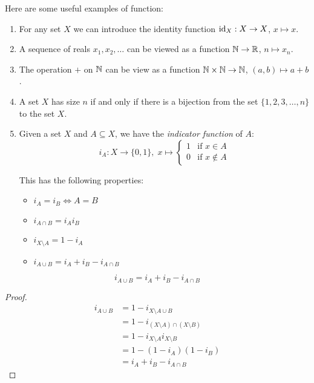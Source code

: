 \documentclass[../main.tex]{subfiles}
\begin{document}
\begin{example}
  Here are some useful examples of function:
  \begin{enumerate}
    \item For any set $X$ we can introduce the identity function $\mathrm{id}_X: X \to X$, $x \mapsto x$.
    \item A sequence of reals $x_1, x_2, \ldots$ can be viewed as a function $\mathbb{N} \to \mathbb{R}$, $n \mapsto x_n$.
    \item The operation $+$ on $\mathbb{N}$ can be view as a function $\mathbb{N} \times \mathbb{N} \to \mathbb{N}$, $(a, b) \mapsto a + b$.
    \item A set $X$ has size $n$ if and only if there is a bijection from the set $\{1, 2, 3, \ldots, n\}$ to the set $X$.
    \item Given a set $X$ and $A \subseteq X$, we have the \textit{indicator function} of $A$:
      \[
        i_A: X \to \{0, 1\},\;
        x \mapsto \begin{cases}
          1 & \text{if } x\in A \\
          0 & \text{if } x\notin A
        \end{cases}
      \]

    This has the following properties:
    \begin{itemize}
      \item $i_A = i_B \iff A = B$
      \item $i_{A \cap B} = i_A i_B$
      \item $i_{X \setminus A} = 1 - i_A$
      \item $i_{A \cup B} = i_A + i_B - i_{A \cap B}$
    \end{itemize}
  \end{enumerate}
\end{example}
\begin{proposition}
  \[
    i_{A \cup B} = i_A + i_B - i_{A \cap B}
  \]
\end{proposition}
\begin{proof}
  \begin{align*}
    i_{A \cup B} &= 1 - i_{X \setminus A \cup B} \\
                 &= 1 - i_{(X \setminus A) \cap (X \setminus B)} \\
                 &= 1 - i_{X \setminus A} i_{X \setminus B} \\
                 &= 1 - (1 - i_A)(1 - i_B) \\
                 &= i_A + i_B - i_{A \cap B}
  \end{align*}
\end{proof}
\end{document}
